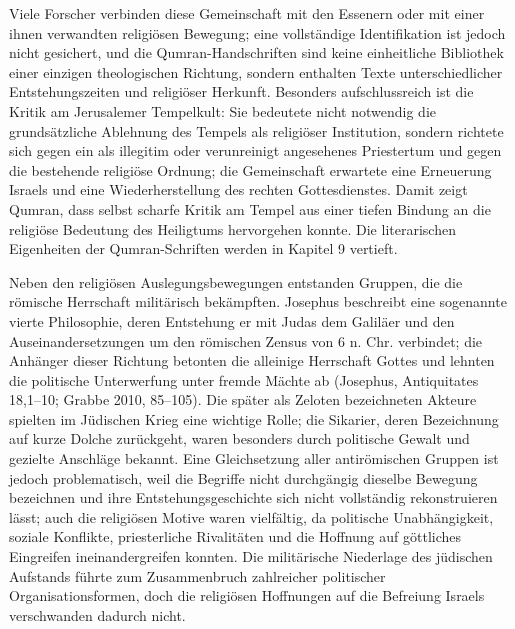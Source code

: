 \documentclass[fontsize=12pt]{mybib}
\begin{document}
Viele Forscher verbinden diese Gemeinschaft mit den Essenern oder mit einer ihnen verwandten religiösen Bewegung; eine vollständige Identifikation ist jedoch nicht gesichert, und die Qumran-Handschriften sind keine einheitliche Bibliothek einer einzigen theologischen Richtung, sondern enthalten Texte unterschiedlicher Entstehungszeiten und religiöser Herkunft. Besonders aufschlussreich ist die Kritik am Jerusalemer Tempelkult: Sie bedeutete nicht notwendig die grundsätzliche Ablehnung des Tempels als religiöser Institution, sondern richtete sich gegen ein als illegitim oder verunreinigt angesehenes Priestertum und gegen die bestehende religiöse Ordnung; die Gemeinschaft erwartete eine Erneuerung Israels und eine Wiederherstellung des rechten Gottesdienstes. Damit zeigt Qumran, dass selbst scharfe Kritik am Tempel aus einer tiefen Bindung an die religiöse Bedeutung des Heiligtums hervorgehen konnte. Die literarischen Eigenheiten der Qumran-Schriften werden in Kapitel 9 vertieft.

Neben den religiösen Auslegungsbewegungen entstanden Gruppen, die die römische Herrschaft militärisch bekämpften. Josephus beschreibt eine sogenannte vierte Philosophie, deren Entstehung er mit Judas dem Galiläer und den Auseinandersetzungen um den römischen Zensus von 6 n. Chr. verbindet; die Anhänger dieser Richtung betonten die alleinige Herrschaft Gottes und lehnten die politische Unterwerfung unter fremde Mächte ab (Josephus, Antiquitates 18,1–10; Grabbe 2010, 85–105). Die später als Zeloten bezeichneten Akteure spielten im Jüdischen Krieg eine wichtige Rolle; die Sikarier, deren Bezeichnung auf kurze Dolche zurückgeht, waren besonders durch politische Gewalt und gezielte Anschläge bekannt. Eine Gleichsetzung aller antirömischen Gruppen ist jedoch problematisch, weil die Begriffe nicht durchgängig dieselbe Bewegung bezeichnen und ihre Entstehungsgeschichte sich nicht vollständig rekonstruieren lässt; auch die religiösen Motive waren vielfältig, da politische Unabhängigkeit, soziale Konflikte, priesterliche Rivalitäten und die Hoffnung auf göttliches Eingreifen ineinandergreifen konnten. Die militärische Niederlage des jüdischen Aufstands führte zum Zusammenbruch zahlreicher politischer Organisationsformen, doch die religiösen Hoffnungen auf die Befreiung Israels verschwanden dadurch nicht.
\end{document}
